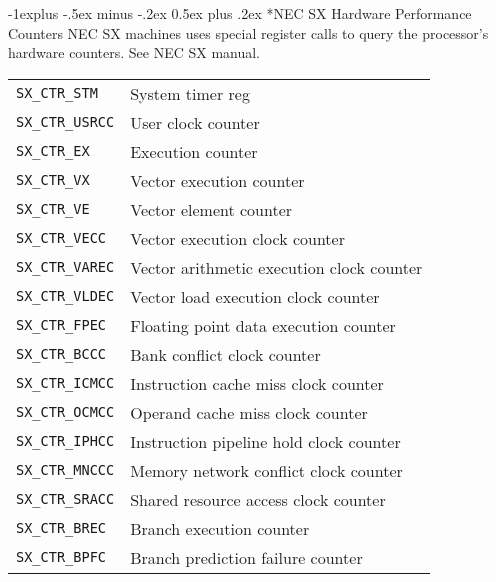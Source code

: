 \documentclass[letterpaper,10pt,landscape]{article}
\makeatletter
\renewcommand{\subsection}{\@startsection{subsection}{2}{0mm}%
                                {-1explus -.5ex minus -.2ex}%
                                {0.5ex plus .2ex}%
                                {\normalfont\normalsize\bfseries}}
\makeatother
\begin{document}
\begin{multicols}{3}
\subsection*{NEC SX Hardware Performance Counters}
NEC SX machines uses special register calls to query the processor's  hardware counters. See NEC SX manual.
\begin{tabular}{@{}ll@{}}
\texttt{SX\_CTR\_STM}   & System timer reg\\
\texttt{SX\_CTR\_USRCC} & User clock counter\\
\texttt{SX\_CTR\_EX}    & Execution counter\\
\texttt{SX\_CTR\_VX }   & Vector execution counter\\
\texttt{SX\_CTR\_VE}    & Vector element counter\\
\texttt{SX\_CTR\_VECC}  & Vector execution clock counter\\
\texttt{SX\_CTR\_VAREC} & Vector arithmetic execution clock counter\\
\texttt{SX\_CTR\_VLDEC} & Vector load execution clock counter\\
\texttt{SX\_CTR\_FPEC}  & Floating point data execution counter\\
\texttt{SX\_CTR\_BCCC}  & Bank conflict clock counter\\
\texttt{SX\_CTR\_ICMCC} & Instruction cache miss clock counter\\
\texttt{SX\_CTR\_OCMCC} & Operand cache miss clock counter\\
\texttt{SX\_CTR\_IPHCC} & Instruction pipeline hold clock counter\\
\texttt{SX\_CTR\_MNCCC} & Memory network conflict clock counter\\
\texttt{SX\_CTR\_SRACC} & Shared resource access clock counter\\
\texttt{SX\_CTR\_BREC}  & Branch execution counter\\
\texttt{SX\_CTR\_BPFC}  & Branch prediction failure counter
\end{tabular}


\end{multicols}
\end{document}
